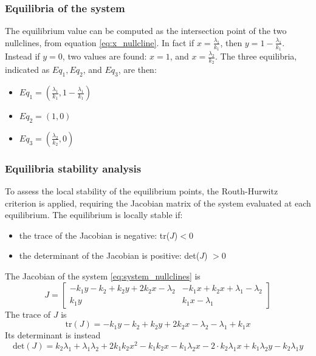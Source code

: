 \subsubsection{Equilibria of the system}
The equilibrium value can be computed as the intersection point of the two nullclines, from equation \eqref{eq:x_nullcline}. In fact if $x =\frac{\lambda_1}{k_1}$, then $y = 1 -\frac{\lambda_1}{k_1}$.
Instead if $y = 0$, two values are found: $x = 1$, and $x = \frac{\lambda_2}{k_2}$.
The three equilibria, indicated as $Eq_1, Eq_2 $, and $Eq_3$, are then:
\begin{itemize}
	\item $Eq_1 = (\frac{\lambda_1}{k_1}, 1-\frac{\lambda_1}{k_1})$
	\item $Eq_2 = (1, 0)$
	\item $Eq_3 = (\frac{\lambda_2}{k_2}, 0)$
\end{itemize}

\subsubsection{Equilibria stability analysis}
To assess the local stability of the equilibrium points, the Routh-Hurwitz criterion is applied, requiring the Jacobian matrix of the system evaluated at each equilibrium. The equilibrium is locally stable if:
\begin{itemize}
	\item the trace of the Jacobian is negative: tr($J$)$< 0$
	\item the determinant of the Jacobian is positive: det($J$) $> 0$
\end{itemize}
The Jacobian of the system \eqref{eq:system_nullclines} is
\begin{equation}
	J = \begin{bmatrix}
		-k_1 y -k_2 +k_2 y+2 k_2 x- \lambda_2 & -k_1 x + k_2 x + \lambda_1-\lambda_2 \\
		k_1 y & k_1 x - \lambda_1
	\end{bmatrix}
\end{equation}
The trace of $J$ is
\begin{equation}
	\text{tr}(J) = -k_1 y -k_2 +k_2y + 2 k_2 x - \lambda_2 -\lambda_1 +k_1 x
\end{equation}
Its determinant is instead
\begin{equation}
	\text{det}(J) = k_2 \lambda_1 + \lambda_1 \lambda_2 + 2 k_1 k_2 x^2 - k_1 k_2 x - k_1 \lambda_2 x - 2\cdot k_2 \lambda_1 x + k_1 \lambda_2 y - k_2 \lambda_1 y
\end{equation}

